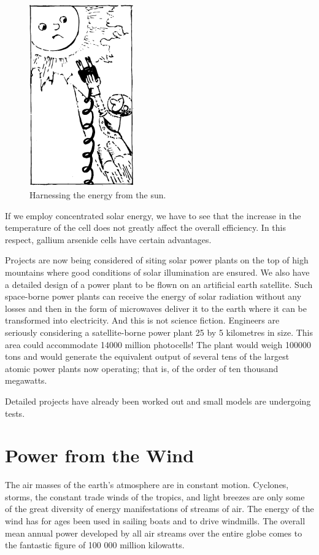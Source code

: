 \begin{figure}[!ht]
\centering
\includegraphics[width=0.4\textwidth]{figures/fig-06-05.pdf}
\caption{Harnessing the energy from the sun.}
\label{fig-6.5}
\end{figure}

If we employ concentrated solar energy, we have to see that the increase in the temperature of the cell does not greatly affect the overall efficiency. In this respect, gal­lium arsenide cells have certain advantages.

Projects are now being considered of siting solar power plants on the top of high mountains where good conditions of solar illumination are ensured. We also have a detailed design of a power plant to be flown on an artificial earth satellite. Such space-borne power plants can receive the energy of solar radiation without any losses and then in the form of microwaves deliver it to the earth where it can be transformed into electricity. And this is not science fiction. Engineers are seriously considering a satellite-borne power plant 25 by 5 kilometres in size. This area could accommodate \num{14000} million photocells! The plant would weigh \num{100000} tons and would generate the equivalent output of several tens of the largest atomic power plants now operating; that is, of the order of ten thousand megawatts.

Detailed projects have already been worked out and small models are undergoing tests.


\section{Power from the Wind}
The air masses of the earth's atmosphere are in constant motion. Cyclones, storms, the constant trade winds of the tropics, and light breezes are only some of the great diversity of energy manifestations of streams of air. The energy of the wind has for ages been used in sailing boats and to drive windmills. The overall mean annual power developed by all air streams over the entire globe comes to the fantastic figure of 100 000 million kilowatts.

